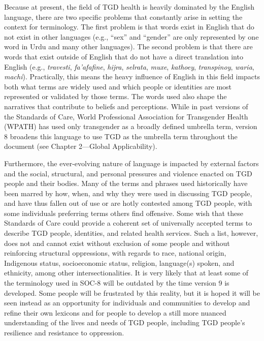 \documentclass[
]{book}
\begin{document}
Because at present, the field of TGD health is
heavily dominated by the English language, there
are two specific problems that constantly arise in
setting the context for terminology. The first
problem is that words exist in English that do
not exist in other languages (e.g., ``sex'' and ``gender'' are only represented by one word in Urdu
and many other languages). The second problem
is that there are words that exist outside of
English that do not have a direct translation into
English (e.g., \emph{travesti}, \emph{fa'afafine}, \emph{hijra}, \emph{selrata},
\emph{muxe}, \emph{kathoey}, \emph{transpinoy}, \emph{waria}, \emph{machi}).
Practically, this means the heavy influence of
English in this field impacts both what terms are
widely used and which people or identities are
most represented or validated by those terms.
The words used also shape the narratives that
contribute to beliefs and perceptions. While in
past versions of the Standards of Care, World
Professional Association for Transgender Health
(WPATH) has used only transgender as a broadly
defined umbrella term, version 8 broadens this
language to use TGD as the umbrella term
throughout the document (see Chapter 2---Global
Applicability).

Furthermore, the ever-evolving nature of language is impacted by external factors and the
social, structural, and personal pressures and violence enacted on TGD people and their bodies.
Many of the terms and phrases used historically
have been marred by how, when, and why they
were used in discussing TGD people, and have
thus fallen out of use or are hotly contested among
TGD people, with some individuals preferring
terms others find offensive. Some wish that these
Standards of Care could provide a coherent set of
universally accepted terms to describe TGD people, identities, and related health services. Such a
list, however, does not and cannot exist without
exclusion of some people and without reinforcing
structural oppressions, with regards to race,
national origin, Indigenous status, socioeconomic
status, religion, language(s) spoken, and ethnicity,
among other intersectionalities. It is very likely
that at least some of the terminology used in
SOC-8 will be outdated by the time version 9 is
developed. Some people will be frustrated by this
reality, but it is hoped it will be seen instead as
an opportunity for individuals and communities
to develop and refine their own lexicons and for
people to develop a still more nuanced understanding of the lives and needs of TGD people,
including TGD people's resilience and resistance
to oppression.
\end{document}
